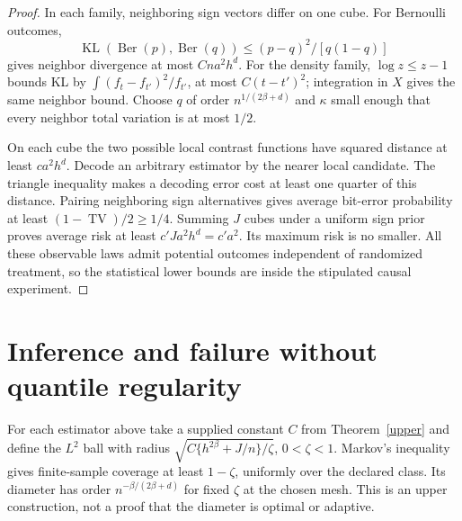 \documentclass[11pt]{article}
\theoremstyle{remark}
\newcommand{\TV}{\operatorname{TV}}
\newcommand{\KL}{\operatorname{KL}}
\begin{document}
\begin{proof}
In each family, neighboring sign vectors differ on one cube. For Bernoulli outcomes,
\[\KL(\operatorname{Ber}(p),\operatorname{Ber}(q))\leq(p-q)^2/[q(1-q)]\]
gives neighbor divergence at most $Cna^2h^d$. For the density family, $\log z\leq z-1$ bounds KL by $\int(f_t-f_{t'})^2/f_{t'}$, at most $C(t-t')^2$; integration in $X$ gives the same neighbor bound. Choose $q$ of order $n^{1/(2\beta+d)}$ and $\kappa$ small enough that every neighbor total variation is at most $1/2$.

On each cube the two possible local contrast functions have squared distance at least $c a^2h^d$. Decode an arbitrary estimator by the nearer local candidate. The triangle inequality makes a decoding error cost at least one quarter of this distance. Pairing neighboring sign alternatives gives average bit-error probability at least $(1-\TV)/2\geq1/4$. Summing $J$ cubes under a uniform sign prior proves average risk at least $c'Ja^2h^d=c'a^2$. Its maximum risk is no smaller. All these observable laws admit potential outcomes independent of randomized treatment, so the statistical lower bounds are inside the stipulated causal experiment.
\end{proof}

\section{Inference and failure without quantile regularity}
For each estimator above take a supplied constant $C$ from Theorem~\ref{upper} and define the $L^2$ ball with radius
$\sqrt{C\{h^{2\beta}+J/n\}/\zeta}$, $0<\zeta<1$. Markov's inequality gives finite-sample coverage at least $1-\zeta$, uniformly over the declared class. Its diameter has order $n^{-\beta/(2\beta+d)}$ for fixed $\zeta$ at the chosen mesh. This is an upper construction, not a proof that the diameter is optimal or adaptive.
\end{document}
